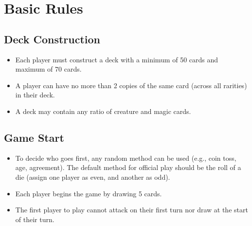 \section{Basic Rules}

\subsection{Deck Construction}
\begin{itemize}
    \item Each player must construct a deck with a minimum of 50 cards and maximum of 70 cards.
    \item A player can have no more than 2 copies of the same card (across all rarities) in their deck.
    \item A deck may contain any ratio of creature and magic cards.
\end{itemize}





\subsection{Game Start}
\begin{itemize}
    \item To decide who goes first, any random method can be used (e.g., coin toss, age, agreement). The default method for official play should be the roll of a die (assign one player as even, and another as odd).
    \item Each player begins the game by drawing 5 cards.
    \item The first player to play cannot attack on their first turn nor draw at the start of their turn.
\end{itemize}








